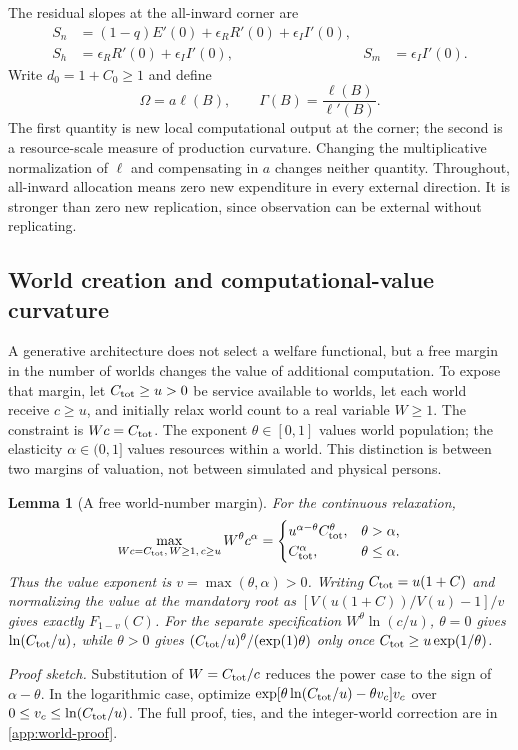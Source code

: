 \documentclass[11pt,a4paper]{article}
\newtheorem{lemma}[proposition]{Lemma}
\theoremstyle{definition}\newtheorem{definition}{Definition}
\begin{document}
The residual slopes at the all-inward corner are
\begin{align}
 S_n&=(1-q)E'(0)+\epsilon_RR'(0)+\epsilon_II'(0),\nonumber\\
 S_h&=\epsilon_RR'(0)+\epsilon_II'(0),&
 S_m&=\epsilon_II'(0).
 \label{eq:slopes}
\end{align}
Write $d_0=1+C_0\geq1$ and define
\begin{equation}
 \Omega=a\ell(B),\qquad
 \Gamma(B)=\frac{\ell(B)}{\ell'(B)}.
 \label{eq:omega-gamma}
\end{equation}
The first quantity is new local computational output at the corner;
the second is a resource-scale measure of production curvature.
Changing the multiplicative normalization of $\ell$ and compensating in
$a$ changes neither quantity. Throughout, all-inward allocation means
zero new expenditure in every external direction. It is stronger than
zero new replication, since observation can be external without
replicating.

\subsection{World creation and computational-value curvature}
\label{sec:world-value}
A generative architecture does not select a welfare functional, but a free
margin in the number of worlds changes the value of additional computation.
To expose that margin, let $C_{\rm tot}\geq u>0$ be service available to
worlds, let each world receive $c\geq u$, and initially relax world count
to a real variable $W\geq1$. The constraint is $Wc=C_{\rm tot}$. The
exponent $\theta\in[0,1]$ values world population; the elasticity
$\alpha\in(0,1]$ values resources within a world. This distinction is
between two margins of valuation, not between simulated and physical
persons.

\begin{lemma}[A free world-number margin]
\label{lem:world-curvature}
For the continuous relaxation,
\begin{equation}
 \max_{Wc=C_{\rm tot},\,W\geq1,\,c\geq u}W^\theta c^\alpha
 =\begin{cases}
 u^{\alpha-\theta}C_{\rm tot}^{\theta},&\theta>\alpha,\\
 C_{\rm tot}^{\alpha},&\theta\leq\alpha.
 \end{cases}
 \label{eq:world-value}
\end{equation}
Thus the value exponent is $v=\max(\theta,\alpha)>0$. Writing
$C_{\rm tot}=u(1+C)$ and normalizing the value at the mandatory root
as $[V(u(1+C))/V(u)-1]/v$ gives exactly $F_{1-v}(C)$.
For the separate specification $W^\theta\ln(c/u)$, $\theta=0$ gives
$\ln(C_{\rm tot}/u)$, while $\theta>0$ gives
$(C_{\rm tot}/u)^\theta/(\exp(1)\theta)$ only once
$C_{\rm tot}\geq u\exp(1/\theta)$.
\end{lemma}
\noindent\emph{Proof sketch.}
Substitution of $W=C_{\rm tot}/c$ reduces the power case to the sign
of $\alpha-\theta$. In the logarithmic case, optimize
$\exp[\theta\ln(C_{\rm tot}/u)-\theta v_c]v_c$ over
$0\leq v_c\leq\ln(C_{\rm tot}/u)$. The full proof, ties, and the
integer-world correction are in \cref{app:world-proof}.
\end{document}
